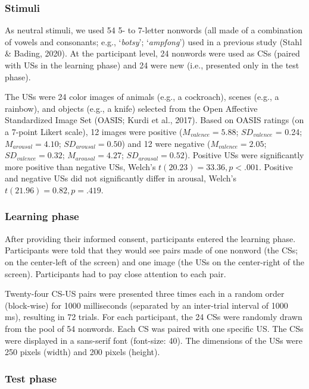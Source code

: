 \documentclass[
  man,floatsintext]{apa6}
\begin{document}
\hypertarget{stimuli}{%
\subsubsection{Stimuli}\label{stimuli}}

As neutral stimuli, we used 54 5- to 7-letter nonwords (all made of a combination of vowels and consonants; e.g., `\emph{botsy}'; `\emph{ampfong}') used in a previous study (Stahl \& Bading, 2020). At the participant level, 24 nonwords were used as CSs (paired with USs in the learning phase) and 24 were new (i.e., presented only in the test phase).

The USs were 24 color images of animals (e.g., a cockroach), scenes (e.g., a rainbow), and objects (e.g., a knife) selected from the Open Affective Standardized Image Set (OASIS; Kurdi et al., 2017). Based on OASIS ratings (on a 7-point Likert scale), 12 images were positive (\(M_{valence} = 5.88\); \(SD_{valence}\) = 0.24; \(M_{arousal} = 4.10\); \(SD_{arousal} = 0.50\)) and 12 were negative (\(M_{valence} = 2.05\); \(SD_{valence} = 0.32\); \(M_{arousal} = 4.27\); \(SD_{arousal} = 0.52\)). Positive USs were significantly more positive than negative USs, Welch's \(t(20.23) = 33.36, p < .001\). Positive and negative USs did not significantly differ in arousal, Welch's \(t(21.96) = 0.82, p = .419\).

\hypertarget{learning-phase}{%
\subsubsection{Learning phase}\label{learning-phase}}

After providing their informed consent, participants entered the learning phase. Participants were told that they would see pairs made of one nonword (the CSs; on the center-left of the screen) and one image (the USs on the center-right of the screen). Participants had to pay close attention to each pair.

Twenty-four CS-US pairs were presented three times each in a random order (block-wise) for 1000 milliseconds (separated by an inter-trial interval of 1000 ms), resulting in 72 trials. For each participant, the 24 CSs were randomly drawn from the pool of 54 nonwords. Each CS was paired with one specific US. The CSs were displayed in a sans-serif font (font-size: 40). The dimensions of the USs were 250 pixels (width) and 200 pixels (height).

\hypertarget{test-phase}{%
\subsubsection{Test phase}\label{test-phase}}
\end{document}
